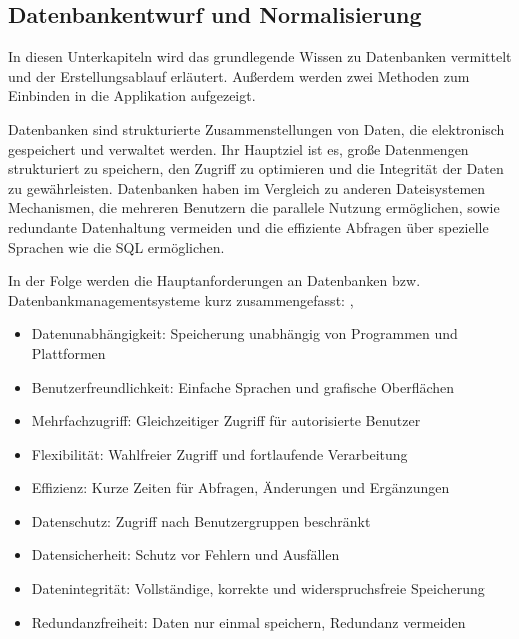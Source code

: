 \subsection{Datenbankentwurf und Normalisierung}
\label{subsec:datenbankentwurf-und-normalisierung}
In diesen Unterkapiteln wird das grundlegende Wissen zu Datenbanken vermittelt und der Erstellungsablauf erläutert.
Außerdem werden zwei Methoden zum Einbinden in die Applikation aufgezeigt.

Datenbanken sind strukturierte Zusammenstellungen von Daten, die elektronisch gespeichert und verwaltet werden.
Ihr Hauptziel ist es, große Datenmengen strukturiert zu speichern, den Zugriff zu optimieren und die Integrität der Daten zu gewährleisten.
Datenbanken haben im Vergleich zu anderen Dateisystemen Mechanismen, die mehreren Benutzern die parallele Nutzung ermöglichen,
sowie redundante Datenhaltung vermeiden und die effiziente Abfragen über spezielle Sprachen wie die \ac{SQL} ermöglichen. \cite*[6]{Fuchs2021}

In der Folge werden die Hauptanforderungen an Datenbanken bzw. Datenbankmanagementsysteme kurz zusammengefasst: \cite*[7]{Herrmann2018},\cite*[6]{Fuchs2021}
\begin{itemize}
\item Datenunabhängigkeit: Speicherung unabhängig von Programmen und Plattformen
\item
Benutzerfreundlichkeit: Einfache Sprachen und grafische Oberflächen
\item
Mehrfachzugriff: Gleichzeitiger Zugriff für autorisierte Benutzer
\item
Flexibilität: Wahlfreier Zugriff und fortlaufende Verarbeitung
\item
Effizienz: Kurze Zeiten für Abfragen, Änderungen und Ergänzungen
\item
Datenschutz: Zugriff nach Benutzergruppen beschränkt
\item
Datensicherheit: Schutz vor Fehlern und Ausfällen
\item
Datenintegrität: Vollständige, korrekte und widerspruchsfreie Speicherung
\item
Redundanzfreiheit: Daten nur einmal speichern, Redundanz vermeiden
\end{itemize}




